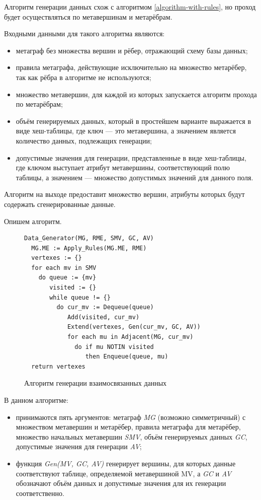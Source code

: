Алгоритм генерации данных схож с алгоритмом \ref{algorithm-with-rules}, но проход будет осуществляться по метавершинам и метарёбрам.

Входными данными для такого алгоритма являются:
\begin{itemize}
  \item метаграф без множества вершин и рёбер, отражающий схему базы данных;
  \item правила метаграфа, действующие исключительно на множество метарёбер, так как рёбра в алгоритме не используются;
  \item множество метавершин, для каждой из которых запускается алгоритм прохода по метарёбрам;
  \item объём генерируемых данных, который в простейшем варианте выражается в виде хеш-таблицы, где ключ — это метавершина, а значением является количество данных, подлежащих генерации;
  \item допустимые значения для генерации, представленные в виде хеш-таблицы, где ключом выступает атрибут метавершины, соответствующий полю таблицы, а значением — множество допустимых значений для данного поля.
\end{itemize}

Алгоритм на выходе предоставит множество вершин, атрибуты которых будут содержать сгенерированные данные.

Опишем алгоритм.

\begin{figure}
  \begin{lstlisting}
Data_Generator(MG, RME, SMV, GC, AV)
  MG.ME := Apply_Rules(MG.ME, RME)
  vertexes := {}
  for each mv in SMV
    do queue := {mv}
       visited := {}
       while queue != {}
         do cur_mv := Dequeue(queue)
            Add(visited, cur_mv)
            Extend(vertexes, Gen(cur_mv, GC, AV))
            for each mu in Adjacent(MG, cur_mv)
              do if mu NOTIN visited
                 then Enqueue(queue, mu)
  return vertexes
  \end{lstlisting}
  \caption{Алгоритм генерации взаимосвязанных данных}
  \label{algorithm-data-gen}
\end{figure}

В данном алгоритме:
\begin{itemize}
  \item принимаются пять аргументов: метаграф \textit{MG} (возможно симметричный) с множеством метавершин и метарёбер, правила метаграфа для метарёбер, множество начальных метавершин \textit{SMV}, объём генерируемых данных \textit{GC}, допустимые значения для генерации \textit{AV};
  \item функция \textit{Gen(MV, GC, AV)} генерирует вершины, для которых данные соответствуют таблице, определяемой метавершиной MV, а \textit{GC} и \textit{AV} обозначают объём данных и допустимые значения для их генерации соответственно.
\end{itemize}

